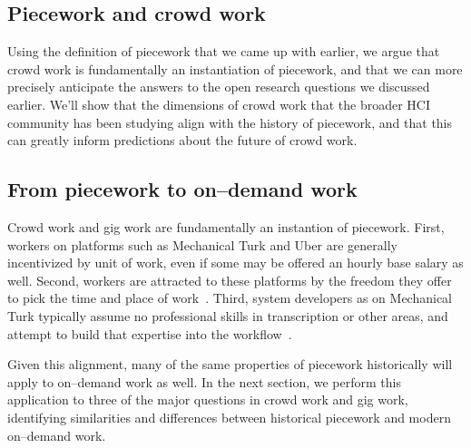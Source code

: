 \documentclass[trackingWork]{subfiles}
\begin{document}
\subsection{Piecework and crowd work}

Using the definition of piecework that we came up with earlier, we argue that
crowd work is fundamentally an instantiation of piecework, and
that we can more precisely anticipate the answers to the open research questions we discussed earlier.
We'll show that the dimensions of crowd work that the broader HCI community has been studying
align with the history of piecework, and that this can greatly inform predictions about the future of crowd work.
\subsection{From piecework to on--demand work}
Crowd work and gig work are fundamentally an instantion of piecework.
First, workers on platforms such as Mechanical Turk and Uber are generally incentivized by unit of work, even if some may be offered an hourly base salary as well.
Second, workers are attracted to these platforms by the freedom they offer to pick the time and place of work~\cite{martin2014being,whyWouldAnyoneBrewer}.
Third, system developers as on Mechanical Turk typically assume no professional skills in transcription or other areas, and attempt to build that expertise into the workflow~\cite{noronha2011platemate,bernsteinSoylent}.

Given this alignment, many of the same properties of piecework historically will apply to on--demand work as well. In the next section, we perform this application to three of the major questions in crowd work and gig work, identifying similarities and differences between historical piecework and modern on--demand work.

\onlyinsubfile{
  \printbibliography
  }
\end{document}
